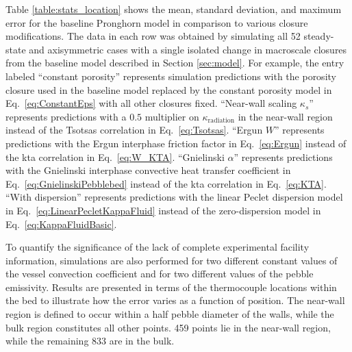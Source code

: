 Table \ref{table:stats_location} shows the mean, standard deviation, and maximum error for the baseline Pronghorn model in comparison to various closure modifications. The data in each row was obtained by simulating all 52 steady-state and axisymmetric cases with a single isolated change in macroscale closures from the baseline model described in Section \ref{sec:model}. For example, the entry labeled ``constant porosity'' represents simulation predictions with the porosity closure used in the baseline model replaced by the constant porosity model in Eq.\ \eqref{eq:ConstantEps} with all other closures fixed. ``Near-wall scaling \(\kappa_s\)'' represents predictions with a \(0.5\) multiplier on \(\kappa_\text{radiation}\) in the near-wall region instead of the Tsotsas correlation in Eq.\ \eqref{eq:Tsotsas}. ``Ergun \(W\)'' represents predictions with the Ergun interphase friction factor in Eq.\ \eqref{eq:Ergun} instead of the \gls{kta} correlation in Eq.\ \eqref{eq:W_KTA}. ``Gnielinski \(\alpha\)'' represents predictions with the Gnielinski interphase convective heat transfer coefficient in Eq.\ \eqref{eq:GnielinskiPebblebed} instead of the \gls{kta} correlation in Eq.\ \eqref{eq:KTA}. ``With dispersion'' represents predictions with the linear Peclet dispersion model in Eq.\ \eqref{eq:LinearPecletKappaFluid} instead of the zero-dispersion model in Eq.\ \eqref{eq:KappaFluidBasic}.

To quantify the significance of the lack of complete experimental facility information, simulations are also performed for two different constant values of the vessel convection coefficient and for two different values of the pebble emissivity. Results are presented in terms of the thermocouple locations within the bed to illustrate how the error varies as a function of position. The near-wall region is defined to occur within a half pebble diameter of the walls, while the bulk region constitutes all other points. 459 points lie in the near-wall region, while the remaining 833 are in the bulk.

